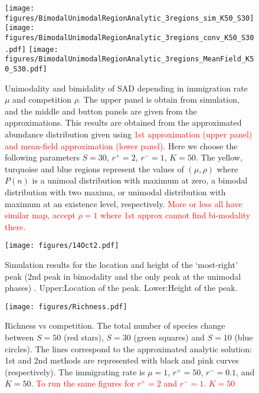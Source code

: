 \documentclass[%
 amsmath,amssymb,
 reprint,%
]{revtex4-2}
\begin{document}
\begin{figure}
    \centering
    \texttt{[image: figures/BimodalUnimodalRegionAnalytic\_3regions\_sim\_K50\_S30]}
    \texttt{[image: figures/BimodalUnimodalRegionAnalytic\_3regions\_conv\_K50\_S30.pdf]}
\texttt{[image: figures/BimodalUnimodalRegionAnalytic\_3regions\_MeanField\_K50\_S30.pdf]}
    \caption{Unimodality and bimidality of SAD depending in immigration rate $\mu$ and competition $\rho$. The upper panel is obtain from simulation, and the middle and button panels are given from the approximations. This results are obtained from the approximated abundance distribution given using \textcolor{red}{ 1st approximation (upper panel) and mean-field approximation (lower panel)}. Here we choose the following parameters $S=30$, $r^+=2$, $r^-=1$, $K=50$. The yellow, turquoise and blue regions represent the values of $(\mu, \rho)$ where $P(n)$ is a unimoal distribution with maximum at zero, a bimodal distribution with two maxima, or unimodal distribution with maximum at an existence level, respectively. \textcolor{red}{More or less all have similar map, accept $\rho=1$ where 1st approx cannot find bi-modality there.  }   }
    \label{fig:BimodalUnimodal}
\end{figure}

 \begin{figure}
    \centering
    \texttt{[image: figures/14Oct2.pdf]}
    \caption{Simulation results for the location and height of the `most-right' peak (2nd peak in bimodality and the only peak at the unimodal phases) .  Upper:Location of the peak. Lower:Height of the peak. }
\end{figure}

\begin{figure}
    \centering
    \texttt{[image: figures/Richness.pdf]} 
    \caption{Richness vs competition. %
    The total number of species change between $S=50$ (red stars), $S=30$ (green squares) and $S=10$ (blue circles). The lines correspond to the approximated analytic solution: 1st and 2nd methods are represented with black and pink curves (respectively). The immigrating rate is $\mu=1$, %
    $r^+=50$, $r^-=0.1$, and $K=50$.
    \textcolor{red}{To run the same figures for $r^+=2$ and $r^-=1$. $K=50$
    }
    }
    \label{fig:Ricness}
\end{figure}
\end{document}
